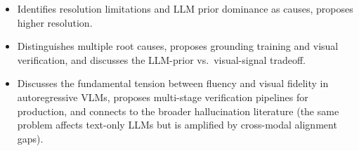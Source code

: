 \begin{interviewq}
\goodgreat
\begin{itemize}
    \item {} Identifies resolution limitations and LLM prior dominance as causes, proposes higher resolution.
    \item {} Distinguishes multiple root causes, proposes grounding training and visual verification, and discusses the LLM-prior vs.\ visual-signal tradeoff.
    \item {} Discusses the fundamental tension between fluency and visual fidelity in autoregressive VLMs, proposes multi-stage verification pipelines for production, and connects to the broader hallucination literature (the same problem affects text-only LLMs but is amplified by cross-modal alignment gaps).
\end{itemize}

\end{interviewq}


